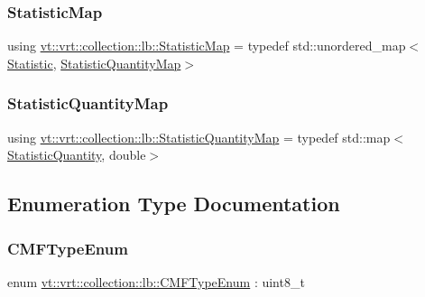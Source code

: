 \subsubsection{\texorpdfstring{Statistic\+Map}{StatisticMap}}
{\footnotesize\ttfamily using \hyperlink{namespacevt_1_1vrt_1_1collection_1_1lb_a497ad83ef5825f2ea18ed20a228870d3}{vt\+::vrt\+::collection\+::lb\+::\+Statistic\+Map} = typedef std\+::unordered\+\_\+map$<$\hyperlink{namespacevt_1_1vrt_1_1collection_1_1lb_af0e20ef9afee77295053aa83bf1348b1}{Statistic}, \hyperlink{namespacevt_1_1vrt_1_1collection_1_1lb_aa3a389ff9262dd6be27791dcf037ef38}{Statistic\+Quantity\+Map}$>$}

\mbox{\label{namespacevt_1_1vrt_1_1collection_1_1lb_aa3a389ff9262dd6be27791dcf037ef38}} 
\subsubsection{\texorpdfstring{Statistic\+Quantity\+Map}{StatisticQuantityMap}}
{\footnotesize\ttfamily using \hyperlink{namespacevt_1_1vrt_1_1collection_1_1lb_aa3a389ff9262dd6be27791dcf037ef38}{vt\+::vrt\+::collection\+::lb\+::\+Statistic\+Quantity\+Map} = typedef std\+::map$<$\hyperlink{namespacevt_1_1vrt_1_1collection_1_1lb_a74989c7b4dd16fcc067e90a29cd1febe}{Statistic\+Quantity}, double$>$}



\subsection{Enumeration Type Documentation}
\mbox{\label{namespacevt_1_1vrt_1_1collection_1_1lb_ada1e381e6b19ba9f8277d4f698445404}} 
\subsubsection{\texorpdfstring{C\+M\+F\+Type\+Enum}{CMFTypeEnum}}
{\footnotesize\ttfamily enum \hyperlink{namespacevt_1_1vrt_1_1collection_1_1lb_ada1e381e6b19ba9f8277d4f698445404}{vt\+::vrt\+::collection\+::lb\+::\+C\+M\+F\+Type\+Enum} \+: uint8\+\_\+t\hspace{0.3cm}{\ttfamily [strong]}}



